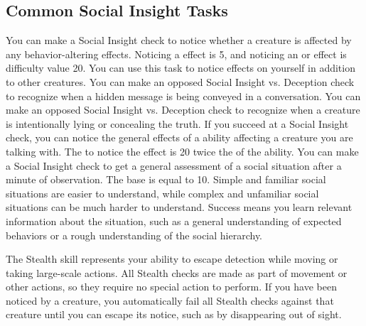   \subsection{Common Social Insight Tasks}
     You can make a Social Insight check to notice whether a creature is affected by any behavior-altering effects.
    Noticing a  effect is  5, and noticing an  or  effect is difficulty value 20.
    You can use this task to notice effects on yourself in addition to other creatures.
     You can make an opposed Social Insight vs. Deception check to recognize when a hidden message is being conveyed in a conversation.
     You can make an opposed Social Insight vs. Deception check to recognize when a creature is intentionally lying or concealing the truth.
     If you succeed at a Social Insight check, you can notice the general effects of a  ability affecting a creature you are talking with.
    The  to notice the effect is 20 \add twice the  of the ability.
    You can make a Social Insight check to get a general assessment of a social situation after a minute of observation.
    The base  is equal to 10.
    Simple and familiar social situations are easier to understand, while complex and unfamiliar social situations can be much harder to understand.
    Success means you learn relevant information about the situation, such as a general understanding of expected behaviors or a rough understanding of the social hierarchy.

\newpage
{}
  The Stealth skill represents your ability to escape detection while moving or taking large-scale actions.
  All Stealth checks are made as part of movement or other actions, so they require no special action to perform.
  If you have been noticed by a creature, you automatically fail all Stealth checks against that creature until you can escape its notice, such as by disappearing out of sight.

